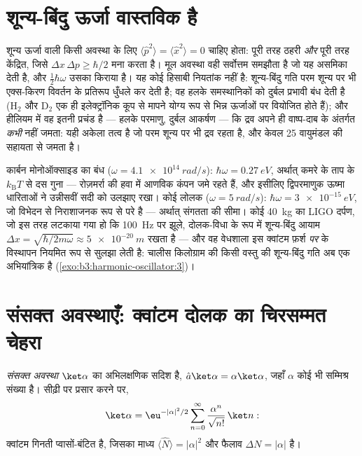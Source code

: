 \section{शून्य-बिंदु ऊर्जा वास्तविक है}

\begin{remark}[फ़र्श और नीचा क्यों नहीं हो सकता]\label{rem:b3:harmonic-oscillator:zeropoint}
शून्य ऊर्जा वाली किसी अवस्था के लिए $\langle\hat p^2\rangle =
\langle\hat x^2\rangle = 0$ चाहिए होता: पूरी तरह ठहरी \emph{और} पूरी
तरह केंद्रित, जिसे $\Delta x\,\Delta p \ge \hbar/2$ मना करता है। मूल
अवस्था वही सर्वोत्तम समझौता है जो यह असमिका देती है, और
$\tfrac12\hbar\omega$ उसका किराया है। यह कोई हिसाबी नियतांक नहीं है:
शून्य-बिंदु गति परम शून्य पर भी एक्स-किरण विवर्तन के प्रतिरूप धुँधले कर
देती है; वह हलके समस्थानिकों को दुर्बल प्रभावी बंध देती है (H$_2$ और
D$_2$ एक ही इलेक्ट्रॉनिक कूप से मापने योग्य रूप से भिन्न ऊर्जाओं पर
वियोजित होते हैं); और हीलियम में वह इतनी प्रचंड है --- हलके परमाणु,
दुर्बल आकर्षण --- कि द्रव अपने ही वाष्प-दाब के अंतर्गत \emph{कभी} नहीं
जमता: यही अकेला तत्व है जो परम शून्य पर भी द्रव रहता है, और केवल
25 वायुमंडल की सहायता से जमता है।
\end{remark}

\begin{example}\label{ex:b3:harmonic-oscillator:scales}
कार्बन मोनोऑक्साइड का बंध ($\omega = \qty{4.1e14}{rad/s}$): $\hbar\omega =
\qty{0.27}{eV}$, अर्थात् कमरे के ताप के $k_{\text{B}}T$ से दस गुना ---
रोज़मर्रा की हवा में आणविक कंपन जमे रहते हैं, और इसीलिए द्विपरमाणुक
ऊष्मा धारिताओं ने उन्नीसवीं सदी को उलझाए रखा। कोई लोलक
($\omega = \qty{5}{rad/s}$): $\hbar\omega = \qty{3e-15}{eV}$,
जो विभेदन से निराशाजनक रूप से परे है --- अर्थात् संगतता की सीमा। कोई
\qty{40}{kg} का LIGO दर्पण, जो इस तरह लटकाया गया हो कि
\qty{100}{Hz} पर झूले, दोलक-विधा के रूप में शून्य-बिंदु आयाम $\Delta x =
\sqrt{\hbar/2m\omega} \approx \qty{5e-20}{m}$ रखता है --- और वह
वेधशाला इस क्वांटम फ़र्श \emph{पर} के विस्थापन नियमित रूप से सुलझा लेती
है: चालीस किलोग्राम की किसी वस्तु की शून्य-बिंदु गति अब एक अभियांत्रिक
 है (\cref{exo:b3:harmonic-oscillator:3})।
\end{example}

\section{संसक्त अवस्थाएँ: क्वांटम दोलक का चिरसम्मत चेहरा}

\begin{definition}[संसक्त अवस्थाएँ]\label{def:b3:harmonic-oscillator:coherent}
\emph{संसक्त अवस्था} $\ket\alpha$  का अभिलक्षणिक सदिश है,
$\hat a\ket\alpha = \alpha\ket\alpha$, जहाँ
$\alpha$ कोई भी सम्मिश्र संख्या है। सीढ़ी पर प्रसार करने पर,
\[
\ket\alpha = \eu^{-|\alpha|^2/2}\sum_{n=0}^\infty
\frac{\alpha^n}{\sqrt{n!}}\,\ket n :
\]
क्वांटम गिनती प्वासों-बंटित है, जिसका माध्य $\langle\hat
N\rangle = |\alpha|^2$ और फैलाव $\Delta N = |\alpha|$ है।
\end{definition}


